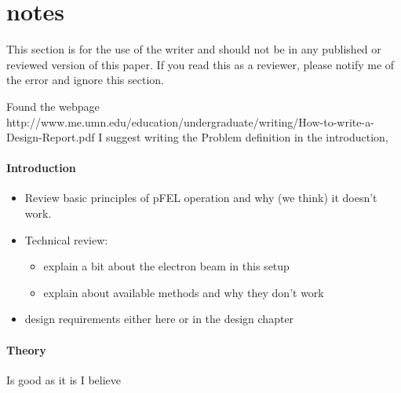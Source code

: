 \section*{notes}

This section is for the use of the writer and should not be in any published or reviewed version of this paper. If you read this as a reviewer, please notify me of the error and ignore this section.

Found the webpage http://www.me.umn.edu/education/undergraduate/writing/How-to-write-a-Design-Report.pdf
I suggest writing the Problem definition in the introduction,
\paragraph{Introduction}
\begin{itemize}
 \item Review basic principles of pFEL operation and why (we think) it doesn't work.
 \item Technical review:
 \begin{itemize}
  \item explain a bit about the electron beam in this setup
  \item explain about available methods and why they don't work
 \end{itemize}
 \item design requirements either here or in the design chapter
\end{itemize}

\paragraph{Theory}
Is good as it is I believe

